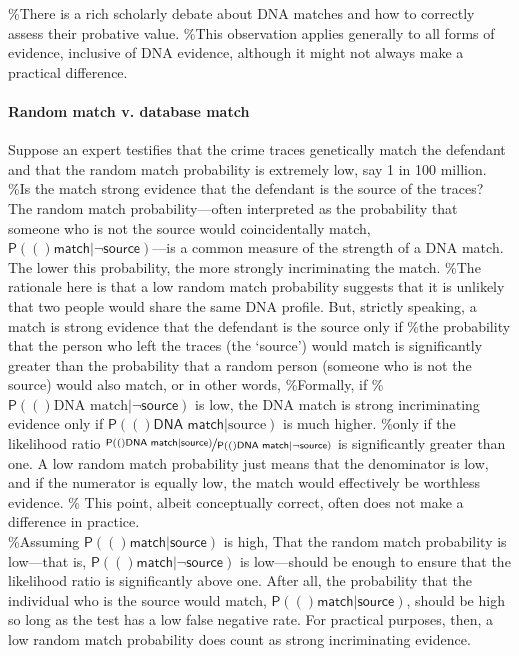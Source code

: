 \documentclass[10pt,dvipsnames,enabledeprecatedfontcommands]{scrartcl}
\let\oldparagraph\paragraph
\renewcommand{\paragraph}[1]{\oldparagraph{#1}\mbox{}}
\newcommand{\pr}[1]{\mathsf{P}(#1)}
\begin{document}
\%There is a rich scholarly debate about DNA matches and how to
correctly assess their probative value. \%This observation applies
generally to all forms of evidence, inclusive of DNA evidence, although
it might not always make a practical difference.

\paragraph{Random match v. database match}

Suppose an expert testifies that the crime traces genetically match the
defendant and that the random match probability is extremely low, say 1
in 100 million. \%Is the match strong evidence that the defendant is the
source of the traces? The random match probability---often interpreted
as the probability that someone who is not the source would
coincidentally match,
\(\pr(\textsf{match} \vert \neg \textsf{source})\)---is a common measure
of the strength of a DNA match. The lower this probability, the more
strongly incriminating the match. \%The rationale here is that a low
random match probability suggests that it is unlikely that two people
would share the same DNA profile. But, strictly speaking, a match is
strong evidence that the defendant is the source only if \%the
probability that the person who left the traces (the `source') would
match is significantly greater than the probability that a random person
(someone who is not the source) would also match, or in other words,
\%Formally, if \%\(\pr(\textrm{DNA match} \vert \neg \textsf{source})\)
is low, the DNA match is strong incriminating evidence only if
\(\pr(\textsf{DNA match} \vert \textrm{source})\) is much higher. \%only
if the likelihood ratio
\(\nicefrac{\pr(\textsf{DNA match} \vert \textsf{source})}{\pr(\textsf{DNA match} \vert \neg \textsf{source})}\)
is significantly greater than one. A low random match probability just
means that the denominator is low, and if the numerator is equally low,
the match would effectively be worthless evidence. \% This point, albeit
conceptually correct, often does not make a difference in practice.\\
\%Assuming \(\pr(\textsf{match} \vert \textsf{source})\) is high, That
the random match probability is low---that is,
\(\pr(\textsf{match} \vert \neg \textsf{source})\) is low---should be
enough to ensure that the likelihood ratio is significantly above one.
After all, the probability that the individual who is the source would
match, \(\pr(\textsf{match} \vert \textsf{source})\), should be high so
long as the test has a low false negative rate. For practical purposes,
then, a low random match probability does count as strong incriminating
evidence.
\end{document}
